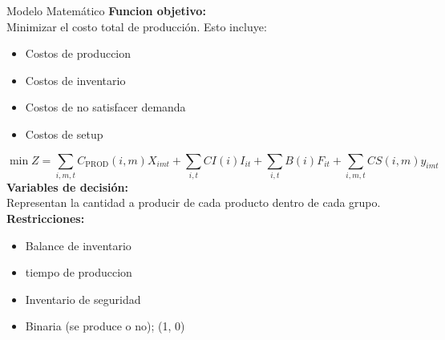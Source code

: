 \documentclass{beamer}
\begin{document}
\begin{frame}{Modelo Matem\'atico}
\footnotesize
  \textbf{Funcion objetivo:} \\
  Minimizar el costo total de producción.
  Esto incluye:
  \begin{itemize}
    \item Costos de produccion
    \item Costos de inventario
    \item Costos de no satisfacer demanda 
    \item Costos de setup
  \end{itemize}
{\footnotesize
\[ \min Z = \sum_{i,m,t} C_{\text{PROD}}(i,m) X_{imt} + \sum_{i,t} CI(i) I_{it} + \sum_{i,t} B(i) F_{it} + \sum_{i,m,t} CS(i,m) y_{imt} \]
}
  \textbf{Variables de decisión:} \\
  Representan la cantidad a producir de cada producto dentro de cada grupo.
  \textbf{Restricciones:} \\
  \begin{itemize}
    \item Balance de inventario
    \item tiempo de produccion
    \item Inventario de seguridad 
    \item Binaria (se produce o no); (1, 0)
  \end{itemize}\\
\end{frame}
\end{document}
